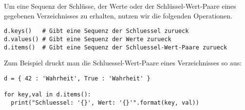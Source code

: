 Um eine Sequenz der Schlüsse, der Werte oder der Schlüssel-Wert-Paare eines gegebenen Verzeichnisses  zu erhalten, nutzen wir die folgenden Operationen.
\begin{lstlisting}
d.keys()   # Gibt eine Sequenz der Schluessel zurueck
d.values() # Gibt eine Sequenz der Werte zurueck
d.items()  # Gibt eine Sequenz der Schluessel-Wert-Paare zurueck
\end{lstlisting}
Zum Beispiel druckt man die Schluessel-Wert-Paare eines Verzeichnisses  so aus:
\begin{lstlisting}
d = { 42 : 'Wahrheit', True : 'Wahrheit' }

for key,val in d.items():
  print("Schluessel: '{}', Wert: '{}'".format(key, val))
\end{lstlisting}
